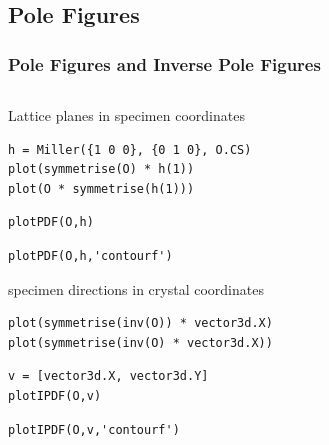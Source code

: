 \documentclass[compress]{beamer}
\begin{document}
\subsection*{Pole Figures}

\begin{frame}[fragile]
  \frametitle{Pole Figures and Inverse Pole Figures}

  \begin{columns}
    \begin{column}{8.5cm}
      Lattice planes in specimen coordinates
      \begin{lstlisting}[style=input]
h = Miller({1 0 0}, {0 1 0}, O.CS)
plot(symmetrise(O) * h(1))
plot(O * symmetrise(h(1)))
      \end{lstlisting}

      \pause
      \medskip

      \begin{lstlisting}[style=input]
plotPDF(O,h)
      \end{lstlisting}
      \pause
      \vspace{-0.3cm}
      \begin{lstlisting}[style=input]
plotPDF(O,h,'contourf')
      \end{lstlisting}

      \pause
      \medskip

      specimen directions in crystal coordinates
      \begin{lstlisting}[style=input]
plot(symmetrise(inv(O)) * vector3d.X)
plot(symmetrise(inv(O) * vector3d.X))
      \end{lstlisting}
      \pause
      \vspace{-0.3cm}
      \begin{lstlisting}[style=input]
v = [vector3d.X, vector3d.Y]
plotIPDF(O,v)
      \end{lstlisting}
      \pause
      \vspace{-0.3cm}
      \begin{lstlisting}[style=input]
plotIPDF(O,v,'contourf')
      \end{lstlisting}


    \end{column}
    \begin{column}{3.5cm}


\end{column}
\end{columns}
\end{frame}
\end{document}
